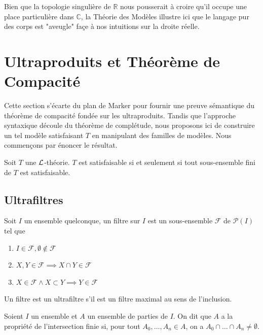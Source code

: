 \begin{rema}
Bien que la topologie singulière de $\mathbb{R}$ nous pousserait à croire qu'il occupe une place particulière dans $\mathbb{C}$, la Théorie des Modèles
illustre ici que le langage pur des corps est "aveugle" façe à nos intuitions sur la droite réelle.
\end{rema}

\section{Ultraproduits et Théorème de Compacité}

\noindent Cette section s'écarte du plan de Marker pour fournir une preuve sémantique du théorème de compacité fondée sur les ultraproduits.
Tandis que l'approche syntaxique découle du théorème de complétude, nous proposons ici de construire un tel modèle satisfaisant $T$ en manipulant des familles de modèles.
Nous commençons par énoncer le résultat.

\begin{theo*}
Soit $T$ une $\mathcal{L}$-théorie. $T$ est satisfaisable si et seulement si tout sous-ensemble fini de $T$ est satisfaisable.
\end{theo*}

\subsection{Ultrafiltres}

\begin{defi}
Soit $I$ un ensemble quelconque, un filtre sur $I$ est un sous-ensemble $\mathcal{F}$ de $\mathcal{P}(I)$ tel que 
\begin{enumerate}
\item $I \in \mathcal{F}, \emptyset \not\in \mathcal{F}$
\item $X, Y \in \mathcal{F} \implies X \cap Y \in \mathcal{F}$
\item $X \in \mathcal{F} \wedge X \subset Y \implies Y \in \mathcal{F}$
\end{enumerate}
Un filtre est un ultrafiltre s'il est un filtre maximal au sens de l'inclusion.
\end{defi}

\begin{defi}
Soient $I$ un ensemble et $A$ un ensemble de parties de $I$. On dit que $A$ a la propriété de l'intersection finie si,
pour tout $A_0,\dots,A_n \in A$, on a $A_0 \cap \dots \cap A_n \ne \emptyset$.
\end{defi}

